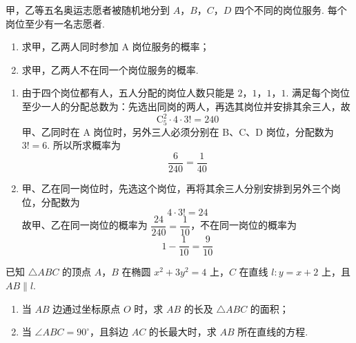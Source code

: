 \begin{problem}
甲，乙等五名奥运志愿者被随机地分到 \(A\)，\(B\)，\(C\)，\(D\) 四个不同的岗位服务. 每个岗位至少有一名志愿者.

\begin{enumerate}
\item 求甲，乙两人同时参加 A 岗位服务的概率；
\item 求甲，乙两人不在同一个岗位服务的概率.
\end{enumerate}
\end{problem}

\begin{solution}
\begin{enumerate}
\item 由于四个岗位都有人，五人分配的岗位人数只能是 \(2\)，\(1\)，\(1\)，\(1\). 满足每个岗位至少一人的分配总数为：先选出同岗的两人，再选其岗位并安排其余三人，故
\[
\mathrm C_5^2\cdot4\cdot3!=240
\]
甲、乙同时在 A 岗位时，另外三人必须分别在 B、C、D 岗位，分配数为 \(3!=6\). 所以所求概率为
\[
\frac6{240}=\frac1{40}
\]
\item 甲、乙在同一岗位时，先选这个岗位，再将其余三人分别安排到另外三个岗位，分配数为
\[
4\cdot3!=24
\]
故甲、乙在同一岗位的概率为 \(\dfrac{24}{240}=\dfrac1{10}\)，不在同一岗位的概率为
\[
1-\frac1{10}=\frac9{10}
\]
\end{enumerate}
\end{solution}

\begin{problem}
已知 \(\triangle ABC\) 的顶点 \(A\)，\(B\) 在椭圆 \(x^{2} + 3y^{2} = 4\) 上，\(C\) 在直线 \(l: y = x + 2\) 上，且 \(AB \parallel l\).

\begin{enumerate}
\item 当 \(AB\) 边通过坐标原点 \(O\) 时，求 \(AB\) 的长及 \(\triangle ABC\) 的面积；
\item 当 \(\angle ABC = 90^{\circ}\)，且斜边 \(AC\) 的长最大时，求 \(AB\) 所在直线的方程.
\end{enumerate}
\end{problem}

